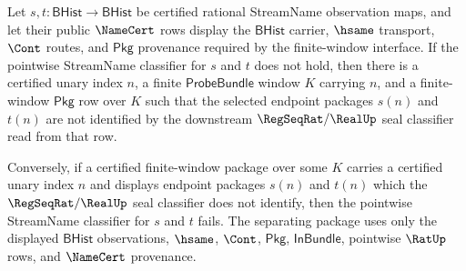 \begin{theorem}
\label{thm:streamname-pointwise-classifier-finite-window-separation}
Let $s,t:\mathsf{BHist}\to\mathsf{BHist}$ be certified rational StreamName
observation maps, and let their public $\NameCert$ rows display the
$\mathsf{BHist}$ carrier, $\hsame$ transport, $\Cont$ routes, and
$\mathsf{Pkg}$ provenance required by the finite-window interface. If the
pointwise StreamName classifier for $s$ and $t$ does not hold, then there is a
certified unary index $n$, a finite $\mathsf{ProbeBundle}$ window $K$ carrying
$n$, and a finite-window $\mathsf{Pkg}$ row over $K$ such that the selected
endpoint packages $s(n)$ and $t(n)$ are not identified by the downstream
$\RegSeqRat/\RealUp$ seal classifier read from that row.

Conversely, if a certified finite-window package over some $K$ carries a
certified unary index $n$ and displays endpoint packages $s(n)$ and $t(n)$
which the $\RegSeqRat/\RealUp$ seal classifier does not identify, then the
pointwise StreamName classifier for $s$ and $t$ fails. The separating package
uses only the displayed $\mathsf{BHist}$ observations, $\hsame$, $\Cont$,
$\mathsf{Pkg}$, $\mathsf{InBundle}$, pointwise $\RatUp$ rows, and $\NameCert$
provenance.
\end{theorem}
